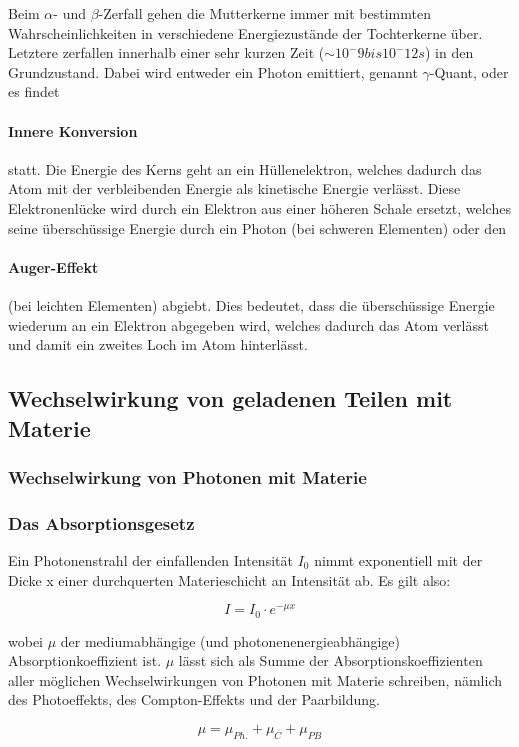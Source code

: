 Beim $\alpha$- und $\beta$-Zerfall gehen die Mutterkerne immer mit bestimmten Wahrscheinlichkeiten in verschiedene Energiezustände der Tochterkerne über. Letztere zerfallen innerhalb einer sehr kurzen Zeit ($\sim 10^-9 bis 10^-12 s$) in den Grundzustand. Dabei wird entweder ein Photon emittiert, genannt $\gamma$-Quant, oder es findet \paragraph{Innere Konversion} statt. Die Energie des Kerns geht an ein Hüllenelektron, welches dadurch das Atom mit der verbleibenden Energie als kinetische Energie verlässt. Diese Elektronenlücke wird durch ein Elektron aus einer höheren Schale ersetzt, welches seine überschüssige Energie durch ein Photon (bei schweren Elementen) oder den \paragraph{Auger-Effekt} (bei leichten Elementen) abgiebt.
Dies bedeutet, dass die überschüssige Energie wiederum an ein Elektron abgegeben wird, welches dadurch das Atom verlässt und damit ein zweites Loch im Atom hinterlässt.

\subsection{Wechselwirkung von geladenen Teilen mit Materie}
\subsubsection{Wechselwirkung von Photonen mit Materie}

\subsubsection{Das Absorptionsgesetz}

Ein Photonenstrahl der einfallenden Intensität $I_0$ nimmt exponentiell mit der Dicke x einer durchquerten Materieschicht an Intensität ab. Es gilt also:

$$ I = I_0\cdot e^{-\mu x} $$

wobei $\mu$ der mediumabhängige (und photonenenergieabhängige) Absorptionkoeffizient ist. $\mu$ lässt sich als Summe der Absorptionskoeffizienten aller möglichen Wechselwirkungen von Photonen mit Materie schreiben, nämlich des Photoeffekts, des Compton-Effekts und der Paarbildung.

$$\mu = \mu_{Ph.} + \mu_{C} + \mu_{PB} $$

